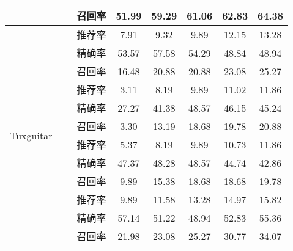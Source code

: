 \begin{table}
\begin{tabular}{cccccccc}
             &  &召回率 & 51.99 & 59.29 & 61.06 & 62.83 & 64.38 \\
\hline
\multirow{12}{*}{Tuxguitar}
&~\multirow{3}{*}{全部组(\%) }
& 推荐率 & 7.91  & 9.32  & 9.89  & 12.15 & 13.28 \\
             &  &精确率 & 53.57 & 57.58 & 54.29 & 48.84 & 48.94 \\
             &  &召回率 & 16.48 & 20.88 & 20.88 & 23.08 & 25.27 \\
\cline{2-8}
&~\multirow{3}{*}{无Code组(\%)}    
& 推荐率 & 3.11  & 8.19  & 9.89  & 11.02 & 11.86 \\
             &  &精确率 & 27.27 & 41.38 & 48.57 & 46.15 & 45.24 \\
             &  &召回率 & 3.30  & 13.19 & 18.68 & 19.78 & 20.88 \\
\cline{2-8}
&~\multirow{3}{*}{无Context组   (\%)}    
 & 推荐率 & 5.37  & 8.19  & 9.89  & 10.73 & 11.86 \\
             &  &精确率 & 47.37 & 48.28 & 48.57 & 44.74 & 42.86 \\
             &  &召回率 & 9.89  & 15.38 & 18.68 & 18.68 & 19.78 \\
\cline{2-8}
&~\multirow{3}{*}{无Evolution组(\%)}    
& 推荐率 & 9.89  & 11.58 & 13.28 & 14.97 & 15.82 \\
             &  &精确率 & 57.14 & 51.22 & 48.94 & 52.83 & 55.36 \\
             &  &召回率 & 21.98 & 23.08 & 25.27 & 30.77 & 34.07\\
\bottomrule[1.5pt]
\end{tabular}
\end{table} 

